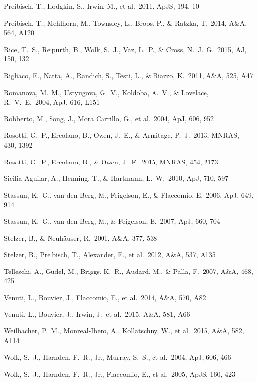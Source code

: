\documentclass[10pt,fleqn,twoside,a4paper]{article}
\newcommand*\aap{A\&A}
\newcommand*\aj{AJ}
\newcommand*\apj{ApJ}
\newcommand*\apjl{ApJ}
\newcommand*\apjs{ApJS}
\newcommand*\mnras{MNRAS}
\begin{document}
\begin{thebibliography}{}
 Preibisch, T., Hodgkin, S., Irwin, M., et al.\ 2011, \apjs, 194, 10

 Preibisch, T., Mehlhorn, M., Townsley, L., Broos, P., \& Ratzka, T.\ 2014, \aap, 564, A120

 Rice, T.~S., Reipurth, B., Wolk, S.~J., Vaz, L.~P., \& Cross, N.~J.~G.\ 2015, \aj, 150, 132 

 Rigliaco, E., Natta, A., Randich, S., Testi, L., \& Biazzo, K.\ 2011, \aap, 525, A47

 Romanova, M.~M., Ustyugova, G.~V., Koldoba, A.~V., \& Lovelace, R.~V.~E.\ 2004, \apjl, 616, L151

 Robberto, M., Song, J., Mora Carrillo, G., et al.\ 2004, \apj, 606, 952 

 Rosotti, G.~P., Ercolano, B., Owen, J.~E., \& Armitage, P.~J.\ 2013, \mnras, 430, 1392

 Rosotti, G.~P., Ercolano, B., \& Owen, J.~E.\ 2015, \mnras, 454, 2173 


 Sicilia-Aguilar, A., Henning, T., \& Hartmann, L.~W.\ 2010, \apj, 710, 597 

 Stassun, K.~G., van den Berg, M., Feigelson, E., \& Flaccomio, E.\ 2006, \apj, 649, 914 

 Stassun, K.~G., van den Berg, M., \& Feigelson, E.\ 2007, \apj, 660, 704 

 Stelzer, B., \& Neuh{\"a}user, R.\ 2001, \aap, 377, 538

 Stelzer, B., Preibisch, T., Alexander, F., et al.\ 2012, \aap, 537, A135

 Telleschi, A., G{\"u}del, M., Briggs, K.~R., Audard, M., \& Palla, F.\ 2007, \aap, 468, 425 

 Venuti, L., Bouvier, J., Flaccomio, E., et al.\ 2014, \aap, 570, A82 

 Venuti, L., Bouvier, J., Irwin, J., et al.\ 2015, \aap, 581, A66 

 Weilbacher, P.~M., Monreal-Ibero, A., Kollatschny, W., et al.\ 2015, \aap, 582, A114 

 Wolk, S.~J., Harnden, F.~R., Jr., Murray, S.~S., et al.\ 2004, \apj, 606, 466

 Wolk, S.~J., Harnden, F.~R., Jr., Flaccomio, E., et al.\ 2005, \apjs, 160, 423 
\end{thebibliography}
\end{document}

